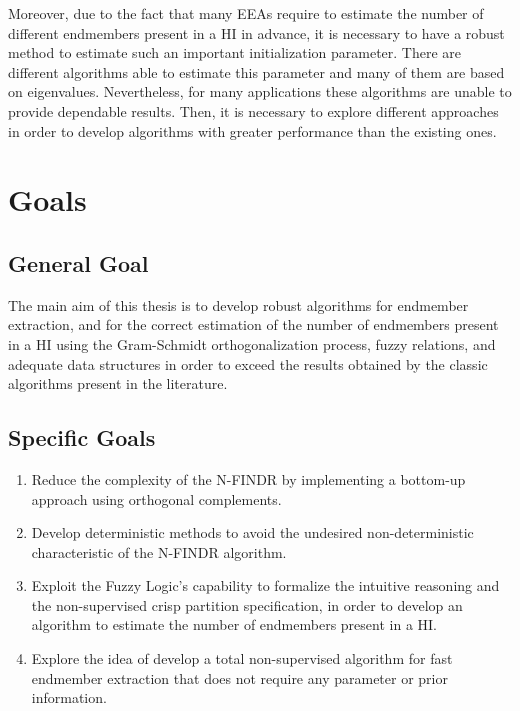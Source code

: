 \documentclass[11pt, oneside]{Thesis} %
\begin{document}
Moreover, due to the fact that many EEAs require to estimate the number of different endmembers present 
in a HI in advance, it is necessary to have a robust method to estimate such an important 
initialization parameter. There are different algorithms able to estimate this parameter and 
many of them are based on eigenvalues. Nevertheless, for many applications these algorithms 
are unable to provide dependable results. Then, it is necessary to explore different 
approaches in order to develop algorithms with greater performance than the existing ones.

\section{Goals}

\subsection{General Goal}

The main aim of this thesis is to develop robust algorithms for endmember extraction, and 
for the correct estimation of the number of endmembers present in a HI using the 
Gram-Schmidt orthogonalization process, fuzzy relations, and adequate data structures in 
order to exceed the results obtained by the classic algorithms present in the literature.

\subsection{Specific Goals}

\begin{enumerate}
	\item Reduce the complexity of the N-FINDR by implementing a bottom-up approach 
	      using orthogonal complements.
	\item Develop deterministic methods to avoid the undesired non-deterministic 
	      characteristic of the N-FINDR algorithm.
	\item Exploit the Fuzzy Logic's capability to formalize the intuitive reasoning and the 
	      non-supervised crisp partition specification, in order to develop an algorithm to 
	      estimate the number of endmembers present in a HI.
	\item Explore the idea of develop a total non-supervised algorithm for fast endmember 
	      extraction that does not require any parameter or prior information.
\end{enumerate}
\end{document}
